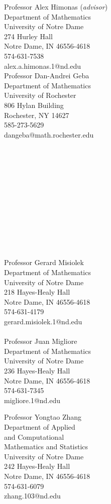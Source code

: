 \documentclass[10pt,oneside]{amsart}
\renewcommand{\section}[2]%
{\vspace{0.7cm}%
\hspace{0in}%
\marginpar{\scshape #1}#2}
\begin{document}
\section{References}
\vspace{-0.85cm}
\begin{multicols}{2}
{Professor Alex Himonas (\textit{advisor}) \\
Department of Mathematics \\
University of Notre Dame  \\	
274 Hurley Hall \\
Notre Dame, IN 46556-4618	\\
574-631-7538  \\
alex.a.himonas.1@nd.edu \\

Professor Dan-Andrei Geba \\
Department of Mathematics \\ 
University of Rochester \\
806 Hylan Building \\ 
Rochester, NY 14627 \\ 
585-273-5629 \\
dangeba@math.rochester.edu \\
\\
\\
\\
\\
\\
\\
\\
\\
\\
\\
\\
\\
Professor Gerard Misiolek \\
Department of Mathematics \\
University of Notre Dame \\
218 Hayes-Healy Hall \\
Notre Dame, IN 46556-4618 \\
574-631-4179 \\
gerard.misiolek.1@nd.edu \\
\\
Professor Juan Migliore \\
Department of Mathematics \\
University of Notre Dame \\
236 Hayes-Healy Hall \\
Notre Dame, IN 46556-4618 \\
574-631-7345\\
migliore.1@nd.edu\\
}

Professor Yongtao Zhang \\
Department of Applied \\ 
and Computational \\ 
Mathematics and Statistics  \\
University of Notre Dame \\
242 Hayes-Healy Hall \\
Notre Dame, IN 46556-4618 \\
574-631-6079 \\
zhang.103@nd.edu \\
\\
\end{multicols}
\end{document}
